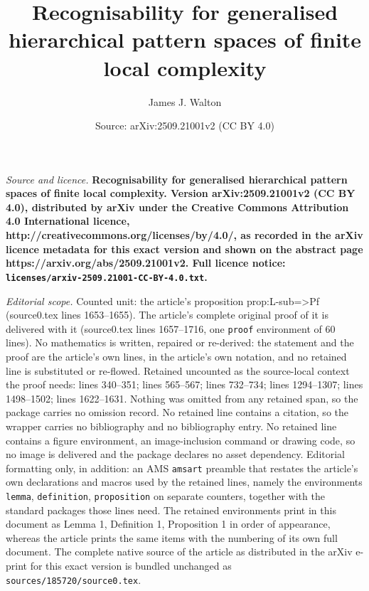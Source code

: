 \documentclass[10pt,a4paper]{amsart}
\title{\bf Recognisability for generalised hierarchical pattern spaces of finite local complexity}
\author{James J. Walton}
\date{Source: arXiv:2509.21001v2 (CC BY 4.0)}
\begin{document}
\maketitle

\noindent\emph{Source and licence.} \bf Recognisability for generalised hierarchical pattern spaces of finite local complexity. Version arXiv:2509.21001v2 (CC BY 4.0), distributed by arXiv under the Creative Commons Attribution 4.0 International licence, http://creativecommons.org/licenses/by/4.0/, as recorded in the arXiv licence metadata for this exact version and shown on the abstract page https://arxiv.org/abs/2509.21001v2. Full licence notice: \texttt{licenses/arxiv-2509.21001-CC-BY-4.0.txt}.\par\smallskip

\noindent\textit{Editorial scope.} Counted unit: the article's proposition prop:L-sub=>Pf (source0.tex lines 1653--1655). The article's complete original proof of it is delivered with it (source0.tex lines 1657--1716, one \texttt{proof} environment of 60 lines). No mathematics is written, repaired or re-derived: the statement and the proof are the article's own lines, in the article's own notation, and no retained line is substituted or re-flowed.  Retained uncounted as the source-local context the proof needs: lines 340--351; lines 565--567; lines 732--734; lines 1294--1307; lines 1498--1502; lines 1622--1631.  Nothing was omitted from any retained span, so the package carries no omission record.  No retained line contains a citation, so the wrapper carries no bibliography and no bibliography entry.  No retained line contains a figure environment, an image-inclusion command or drawing code, so no image is delivered and the package declares no asset dependency.  Editorial formatting only, in addition: an AMS \texttt{amsart} preamble that restates the article's own declarations and macros used by the retained lines, namely the environments \texttt{lemma}, \texttt{definition}, \texttt{proposition} on separate counters, together with the standard packages those lines need.  The retained environments print in this document as Lemma 1, Definition 1, Proposition 1 in order of appearance, whereas the article prints the same items with the numbering of its own full document.  The complete native source of the article as distributed in the arXiv e-print for this exact version is bundled unchanged as \texttt{sources/185720/source0.tex}.
\end{document}
